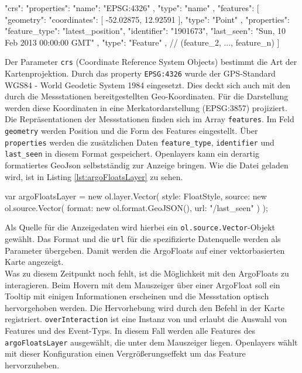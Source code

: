 \begin{javascript}[label={lst:argGeoJson}, caption={Gekürzte geoJSON zur Darstellung der Argo-Floats}]
 {
"crs": {
    "properties": {
      "name": "EPSG:4326"
    },
    "type": "name"
  },
  "features": [
    {
      "geometry": {
        "coordinates": [
          -52.02875,
          12.92591
        ],
        "type": "Point"
      },
      "properties": {
        "feature_type": "latest_position",
        "identifier": "1901673",
        "last_seen": "Sun, 10 Feb 2013 00:00:00 GMT"
      },
      "type": "Feature"
    },
    // (feature_2, ..., feature_n)
    ]
}
\end{javascript}

Der Parameter \texttt{crs} (Coordinate Reference System Objects) bestimmt die Art der Kartenprojektion. Durch das property \texttt{EPSG:4326} wurde der GPS-Standard WGS84 - World Geodetic System 1984 eingesetzt. Dies deckt sich auch mit den durch die Messstationen bereitgestellten Geo-Koordinaten. Für die Darstellung werden diese Koordinaten in eine Merkatordarstellung (EPSG:3857) projiziert.
\\
Die Repräsentationen der Messstationen finden sich im Array \texttt{features}. Im Feld \texttt{geometry} werden Position und die Form des Features eingestellt. Über \texttt{properties} werden die zusätzlichen Daten \texttt{feature\_type}, \texttt{identifier} und \texttt{last\_seen} in diesem Format gespeichert.
Openlayers kann ein derartig formatiertes GeoJson selbstständig zur Anzeige bringen. Wie die Datei geladen wird, ist in Listing \ref{lst:argoFloatsLayer} zu sehen.
\pagebreak
\begin{javascript}[label={lst:argoFloatsLayer}, caption={Die Funktion argoFloatsLayer}]
var argoFloatsLayer = new ol.layer.Vector({
    style: FloatStyle,
    source: new ol.source.Vector({
        format: new ol.format.GeoJSON(),
        url: "/last_seen"
    })
});
\end{javascript}
Als Quelle für die Anzeigedaten wird hierbei ein \texttt{ol.source.Vector}-Objekt gewählt. Das Format und die \texttt{url} für die spezifizierte Datenquelle werden als Parameter übergeben.
Damit werden die ArgoFloats auf einer vektorbasierten Karte angezeigt.
\\
Was zu diesem Zeitpunkt noch fehlt, ist die Möglichkeit mit den ArgoFloats zu interagieren. Beim Hovern mit dem Mauszeiger über einer ArgoFloat soll ein Tooltip mit einigen Informationen erscheinen und die Messstation optisch hervorgehoben werden.  Die Hervorhebung wird durch den Befehl  in der Karte registriert. \texttt{overInteraction} ist eine Instanz von  und erlaubt die Auswahl von Features und des Event-Typs. In diesem Fall werden alle Features des \texttt{argoFloatsLayer} ausgewählt, die unter dem Mauszeiger liegen. Openlayers wählt mit dieser Konfiguration einen Vergrößerungseffekt um das Feature hervorzuheben.

